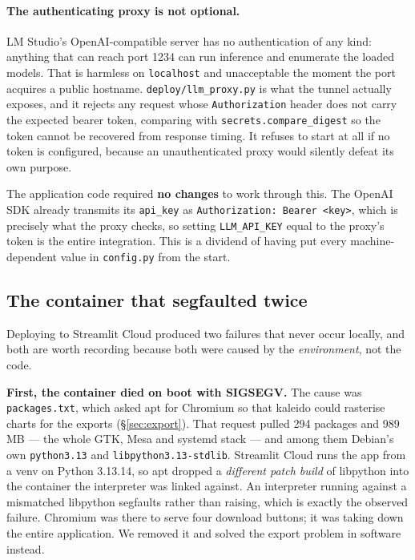 \documentclass[11pt,a4paper]{article}
\begin{document}
\paragraph{The authenticating proxy is not optional.} LM Studio's OpenAI-compatible
server has no authentication of any kind: anything that can reach port 1234 can run
inference and enumerate the loaded models. That is harmless on \texttt{localhost} and
unacceptable the moment the port acquires a public hostname. \texttt{deploy/llm\_proxy.py}
is what the tunnel actually exposes, and it rejects any request whose
\texttt{Authorization} header does not carry the expected bearer token, comparing with
\texttt{secrets.compare\_digest} so the token cannot be recovered from response timing.
It refuses to start at all if no token is configured, because an unauthenticated proxy
would silently defeat its own purpose.

The application code required \textbf{no changes} to work through this. The OpenAI SDK
already transmits its \texttt{api\_key} as \texttt{Authorization: Bearer <key>}, which
is precisely what the proxy checks, so setting \texttt{LLM\_API\_KEY} equal to the
proxy's token is the entire integration. This is a dividend of having put every
machine-dependent value in \texttt{config.py} from the start.

\subsection{The container that segfaulted twice}
\label{sec:segfault}

Deploying to Streamlit Cloud produced two failures that never occur locally, and both
are worth recording because both were caused by the \emph{environment}, not the code.

\textbf{First, the container died on boot with SIGSEGV.} The cause was
\texttt{packages.txt}, which asked apt for Chromium so that kaleido could rasterise
charts for the exports (\S\ref{sec:export}). That request pulled 294 packages and
989\,MB --- the whole GTK, Mesa and systemd stack --- and among them Debian's own
\texttt{python3.13} and \texttt{libpython3.13-stdlib}. Streamlit Cloud runs the app
from a venv on Python 3.13.14, so apt dropped a \emph{different patch build} of
libpython into the container the interpreter was linked against. An interpreter
running against a mismatched libpython segfaults rather than raising, which is exactly
the observed failure. Chromium was there to serve four download buttons; it was taking
down the entire application. We removed it and solved the export problem in software
instead.
\end{document}
